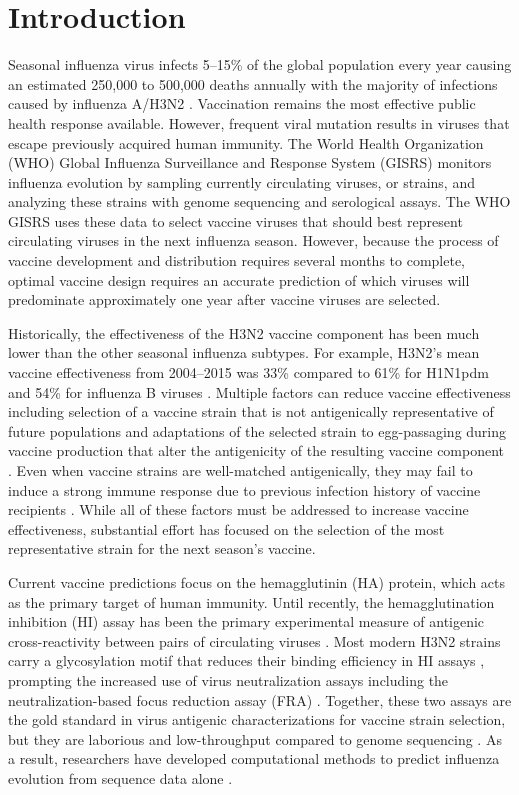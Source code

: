 
\section*{Introduction}

Seasonal influenza virus infects 5--15\% of the global population every year causing an estimated 250,000 to 500,000 deaths annually with the majority of infections caused by influenza A/H3N2 \citep{flufactsheet}.
Vaccination remains the most effective public health response available.
However, frequent viral mutation results in viruses that escape previously acquired human immunity.
The World Health Organization (WHO) Global Influenza Surveillance and Response System (GISRS) monitors influenza evolution by sampling currently circulating viruses, or strains, and analyzing these strains with genome sequencing and serological assays.
The WHO GISRS uses these data to select vaccine viruses that should best represent circulating viruses in the next influenza season.
However, because the process of vaccine development and distribution requires several months to complete, optimal vaccine design requires an accurate prediction of which viruses will predominate approximately one year after vaccine viruses are selected.

Historically, the effectiveness of the H3N2 vaccine component has been much lower than the other seasonal influenza subtypes.
For example, H3N2's mean vaccine effectiveness from 2004--2015 was 33\% compared to 61\% for H1N1pdm and 54\% for influenza B viruses \citep{Belongia2016}.
Multiple factors can reduce vaccine effectiveness including selection of a vaccine strain that is not antigenically representative of future populations \citep{Belongia2016,gouma_antigenic_2020} and adaptations of the selected strain to egg-passaging during vaccine production that alter the antigenicity of the resulting vaccine component \citep{zost_contemporary_2017}.
Even when vaccine strains are well-matched antigenically, they may fail to induce a strong immune response due to previous infection history of vaccine recipients \citep{Cobey2018}.
While all of these factors must be addressed to increase vaccine effectiveness, substantial effort has focused on the selection of the most representative strain for the next season's vaccine.

Current vaccine predictions focus on the hemagglutinin (HA) protein, which acts as the primary target of human immunity.
Until recently, the hemagglutination inhibition (HI) assay has been the primary experimental measure of antigenic cross-reactivity between pairs of circulating viruses \citep{hirst1943studies}.
Most modern H3N2 strains carry a glycosylation motif that reduces their binding efficiency in HI assays \citep{Chambers:2015jt,Zost2017}, prompting the increased use of virus neutralization assays including the neutralization-based focus reduction assay (FRA) \citep{Okuno:1990uu}.
Together, these two assays are the gold standard in virus antigenic characterizations for vaccine strain selection, but they are laborious and low-throughput compared to genome sequencing \citep{Wood:2012ii}.
As a result, researchers have developed computational methods to predict influenza evolution from sequence data alone \citep{Luksza:2014hj,Steinbruck:2014kq,Neher:2014eu}.

